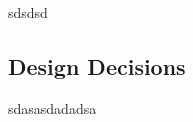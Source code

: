 \documentclass[]{article}
\begin{document}
sdsdsd

\vspace{0.5cm}
\begin{center}
	\section*{Design Decisions}
\end{center}
\vspace{0.5cm}

sdasasdadadsa


\break
\setlength{}
\printbibliography[title={References}]

\end{document}
